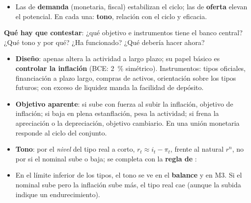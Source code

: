 \documentclass{article}
\begin{document}
\begin{columnas}
\begin{itemize}[itemsep=1.5pt]
\item Las de \textbf{demanda} (monetaria, fiscal) estabilizan el ciclo; las de \textbf{oferta} elevan el potencial. En cada una: \textbf{tono}, relación con el ciclo y eficacia.
\end{itemize}

\begin{ideaclave}
\textbf{Qué hay que contestar}: ¿qué objetivo e instrumentos tiene el banco central? ¿Qué tono y por qué? ¿Ha funcionado? ¿Qué debería hacer ahora?
\end{ideaclave}
\begin{itemize}[itemsep=1.5pt]
\item \textbf{Diseño}: apenas altera la actividad a largo plazo; su papel básico es \textbf{controlar la inflación} (BCE: 2~\% simétrico). Instrumentos: tipos oficiales, financiación a plazo largo, compras de activos, orientación sobre los tipos futuros; con exceso de liquidez manda la facilidad de depósito.
\item \textbf{Objetivo aparente}: si sube con fuerza al subir la inflación, objetivo de inflación; si baja en plena estanflación, pesa la actividad; si frena la apreciación o la depreciación, objetivo cambiario. En una unión monetaria responde al ciclo del conjunto.
\item \textbf{Tono}: por el \emph{nivel} del tipo real a corto, $r_t\approx i_t-\pi_t$, frente al natural $r^n$, no por si el nominal sube o baja; se completa con la \textbf{regla de }:
\end{itemize}
\begin{itemize}[itemsep=1.5pt]
\item En el límite inferior de los tipos, el tono se ve en el \textbf{balance} y en M3. Si el nominal sube pero la inflación sube más, el tipo real cae (aunque la subida indique un endurecimiento).
\end{itemize}

\end{columnas}
\end{document}
